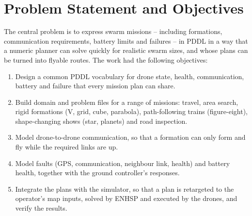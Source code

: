 \documentclass[11pt,a4paper,oneside]{report}
\begin{document}
\section{Problem Statement and Objectives}
The central problem is to express swarm missions -- including formations, communication
requirements, battery limits and failures -- in PDDL in a way that a numeric planner can solve
quickly for realistic swarm sizes, and whose plans can be turned into flyable routes. The work
had the following objectives:
\begin{enumerate}
  \item Design a common PDDL vocabulary for drone state, health, communication, battery and
        failure that every mission plan can share.
  \item Build domain and problem files for a range of missions: travel, area search, rigid
        formations (V, grid, cube, parabola), path-following trains (figure-eight), shape-changing
        shows (star, planets) and road inspection.
  \item Model drone-to-drone communication, so that a formation can only form and fly while the
        required links are up.
  \item Model faults (GPS, communication, neighbour link, health) and battery health, together
        with the ground controller's responses.
  \item Integrate the plans with the simulator, so that a plan is retargeted to the operator's map
        inputs, solved by ENHSP and executed by the drones, and verify the results.
\end{enumerate}
\end{document}
